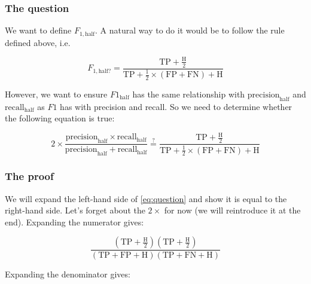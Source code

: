 \documentclass[a4paper,10pt]{article} %
\begin{document}
\subsubsection{The question}\label{sec:question}

We want to define $F_{1,\text{half}}$.
A natural way to do it would be to follow the rule defined above, i.e.

\begin{equation*}
    F_{1,\text{half?}} = \frac{\text{TP}+\frac{\text{H}}{2}}
            {\text{TP}+\frac{1}{2}\times(\text{FP}+\text{FN}) + \text{H}}
\end{equation*}

\noindent However, we want to ensure $F1_{\text{half}}$ has the same relationship with $\text{precision}_{\text{half}}$ and $\text{recall}_{\text{half}}$ as $F1$ has with precision and recall.
So we need to determine whether the following equation is true:

\begin{equation}\label{eq:question}
    2\times\frac{\text{precision}_{\text{half}}\times\text{recall}_{\text{half}}}
            {\text{precision}_{\text{half}} + \text{recall}_{\text{half}}}
    \stackrel{?}{=}
    \frac{\text{TP}+\frac{\text{H}}{2}}
            {\text{TP}+\frac{1}{2}\times(\text{FP}+\text{FN}) + \text{H}}
\end{equation}

\subsubsection{The proof}\label{sec:proof}

We will expand the left-hand side of \eqref{eq:question} and show it is equal to the right-hand side.
Let's forget about the $2\times$ for now (we will reintroduce it at the end).
Expanding the numerator gives:

\begin{equation*}
    \frac{\left(
        \text{TP}+\frac{\text{H}}{2}
    \right)\left(
        \text{TP}+\frac{\text{H}}{2}
    \right)}
    {\left(
        \text{TP} + \text{FP} + \text{H}
    \right)\left(
        \text{TP} + \text{FN} + \text{H}
    \right)}
\end{equation*}

\noindent Expanding the denominator gives:
\end{document}
